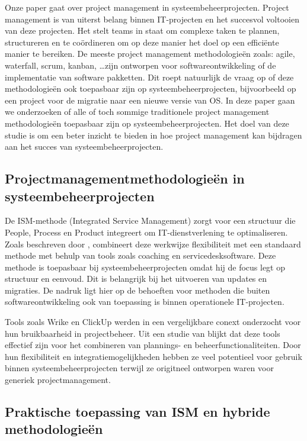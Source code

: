 \documentclass{article}
\begin{document}
    Onze paper gaat over project management in systeembeheerprojecten. 
    Project management is van uiterst belang binnen IT-projecten en het succesvol voltooien van deze projecten. 
    Het stelt teams in staat om complexe taken te plannen, structureren en te coördineren om op deze manier het doel op een efficiënte manier te bereiken.
    De meeste project management methodologieën zoals: agile, waterfall, scrum, kanban, \ldots zijn ontworpen voor softwareontwikkeling of de implementatie van software pakketten.
    Dit roept natuurlijk de vraag op of deze methodologieën ook toepasbaar zijn op systeembeheerprojecten, bijvoorbeeld op een project voor de migratie naar een nieuwe versie van OS.
    In deze paper gaan we onderzoeken of alle of toch sommige traditionele project management methodologieën toepasbaar zijn op systeembeheerprojecten.
    Het doel van deze studie is om een beter inzicht te bieden in hoe project management kan bijdragen aan het succes van systeembeheerprojecten. 

    \subsection{Projectmanagementmethodologieën in systeembeheerprojecten}

    De ISM-methode (Integrated Service Management) zorgt voor een structuur die People, Process en Product integreert om IT-dienstverlening te optimaliseren. 
    Zoals beschreven door \textcite{hoving2010ism}, combineert deze werkwijze flexibiliteit met een standaard methode met behulp van tools zoals coaching en servicedesksoftware.
    Deze methode is toepasbaar bij systeembeheerprojecten omdat hij de focus legt op structuur en eenvoud. Dit is belangrijk bij het uitvoeren van updates en migraties.
    De nadruk ligt hier op de behoeften voor methoden die buiten softwareontwikkeling ook van toepassing is binnen operationele IT-projecten. \autocite{hoving2010ism}

    Tools zoals Wrike en ClickUp werden in een vergelijkbare conext onderzocht voor hun bruikbaarheid in projectbeheer.
    Uit een studie van \textcite{pasaric2022comparison} blijkt dat deze tools effectief zijn voor het combineren van plannings- en beheerfunctionaliteiten.
    Door hun flexibiliteit en integratiemogelijkheden hebben ze veel potentieel voor gebruik binnen systeembeheerprojecten terwijl ze origitneel ontworpen waren voor generiek projectmanagement. \autocite{pasaric2022comparison}

    \subsection{Praktische toepassing van ISM en hybride methodologieën}
\end{document}
